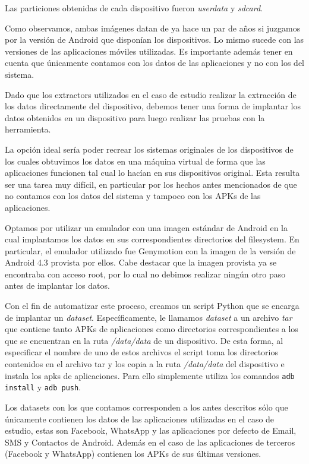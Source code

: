 Las particiones obtenidas de cada dispositivo fueron \emph{userdata} y \emph{sdcard}.

Como observamos, ambas imágenes datan de ya hace un par de años si juzgamos por la versión de Android que disponían los dispositivos. Lo mismo sucede con las versiones de las aplicaciones móviles utilizadas. Es importante además tener en cuenta que únicamente contamos con los datos de las aplicaciones y no con los del sistema.

Dado que los extractors utilizados en el caso de estudio realizar la extracción de los datos directamente del dispositivo, debemos tener una forma de implantar los datos obtenidos en un dispositivo para luego realizar las pruebas con la herramienta.

La opción ideal sería poder recrear los sistemas originales de los dispositivos de los cuales obtuvimos los datos en una máquina virtual de forma que las aplicaciones funcionen tal cual lo hacían en sus dispositivos original. Esta resulta ser una tarea muy difícil, en particular por los hechos antes mencionados de que no contamos con los datos del sistema y tampoco con los APKs de las aplicaciones.

Optamos por utilizar un emulador con una imagen estándar de Android en la cual implantamos los datos en sus correspondientes directorios del filesystem. En particular, el emulador utilizado fue Genymotion \cite{genymotion} con la imagen de la versión de Android 4.3 provista por ellos. Cabe destacar que la imagen provista ya se encontraba con acceso root, por lo cual no debimos realizar ningún otro paso antes de implantar los datos.

Con el fin de automatizar este proceso, creamos un script Python que se encarga de implantar un \emph{dataset}. Específicamente, le llamamos \emph{dataset} a un archivo \emph{tar} que contiene tanto APKs de aplicaciones como directorios correspondientes a los que se encuentran en la ruta \emph{/data/data} de un dispositivo. De esta forma, al especificar el nombre de uno de estos archivos el script toma los directorios contenidos en el archivo tar y los copia a la ruta \emph{/data/data} del dispositivo e instala los apks de aplicaciones. Para ello simplemente utiliza los comandos \texttt{adb install} y \texttt{adb push}.

Los datasets con los que contamos corresponden a los antes descritos sólo que únicamente contienen los datos de las aplicaciones utilizadas en el caso de estudio, estas son Facebook, WhatsApp y las aplicaciones por defecto de Email, SMS y Contactos de Android. Además en el caso de las aplicaciones de terceros (Facebook y WhatsApp) contienen los APKs de sus últimas versiones.


